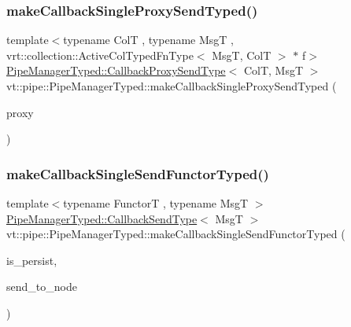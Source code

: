 \mbox{\label{structvt_1_1pipe_1_1_pipe_manager_typed_abc80f7c6999d009ddd2a531cc858698e}} 
\subsubsection{\texorpdfstring{make\+Callback\+Single\+Proxy\+Send\+Typed()}{makeCallbackSingleProxySendTyped()}}
{\footnotesize\ttfamily template$<$typename ColT , typename MsgT , vrt\+::collection\+::\+Active\+Col\+Typed\+Fn\+Type$<$ Msg\+T, Col\+T $>$ $\ast$ f$>$ \\
\hyperlink{structvt_1_1pipe_1_1_pipe_manager_typed_a9259903ba569c54c4e4bc6ad7888e059}{Pipe\+Manager\+Typed\+::\+Callback\+Proxy\+Send\+Type}$<$ ColT, MsgT $>$ vt\+::pipe\+::\+Pipe\+Manager\+Typed\+::make\+Callback\+Single\+Proxy\+Send\+Typed (\begin{DoxyParamCaption}\item[{typename Col\+T\+::\+Proxy\+Type}]{proxy }\end{DoxyParamCaption})}

\mbox{\label{structvt_1_1pipe_1_1_pipe_manager_typed_a1e7b6839175c1234110288b549e99145}} 
\subsubsection{\texorpdfstring{make\+Callback\+Single\+Send\+Functor\+Typed()}{makeCallbackSingleSendFunctorTyped()}}
{\footnotesize\ttfamily template$<$typename FunctorT , typename MsgT $>$ \\
\hyperlink{structvt_1_1pipe_1_1_pipe_manager_typed_a306c7c126ed7fb6c5b53bfcf38726291}{Pipe\+Manager\+Typed\+::\+Callback\+Send\+Type}$<$ MsgT $>$ vt\+::pipe\+::\+Pipe\+Manager\+Typed\+::make\+Callback\+Single\+Send\+Functor\+Typed (\begin{DoxyParamCaption}\item[{bool const}]{is\+\_\+persist,  }\item[{\hyperlink{namespacevt_a866da9d0efc19c0a1ce79e9e492f47e2}{Node\+Type} const \&}]{send\+\_\+to\+\_\+node }\end{DoxyParamCaption})}

